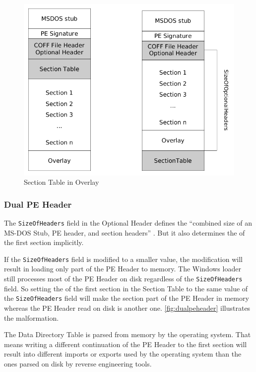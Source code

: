 \begin{figure}
\includegraphics[width=.98\textwidth, height=.60\textheight,keepaspectratio]{graphics/overlaysectable}
\caption{Section Table in Overlay }
\label{fig:overlaysectable} 
\end{figure}

\subsubsection*{Dual PE Header} \label{subsubsec:dualheader}

The \texttt{SizeOfHeaders} field in the Optional Header defines the \enquote{combined size of an MS-DOS Stub, PE header, and section headers} \cite[]{pespec}. But it also determines the \VA{} of the first section implicitly. \cite[slide 15]{vuksan11} 

If the \texttt{SizeOfHeaders} field is modified to a smaller value, the modification will result in loading only part of the PE Header to memory. The Windows loader still processes most of the PE Header on disk regardless of the \texttt{SizeOfHeaders} field. So setting the \VA{} of the first section in the Section Table to the same value of the \texttt{SizeOfHeaders} field will make the section part of the PE Header in memory whereas the PE Header read on disk is another one. \autoref{fig:dualpeheader} illustrates the malformation.

The Data Directory Table is parsed from memory by the operating system. That means writing a different continuation of the PE Header to the first section will result into \eg{} different imports or exports used by the operating system than the ones parsed on disk by reverse engineering tools.

